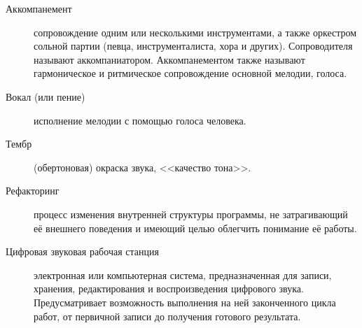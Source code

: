\begin{description}
\item[Аккомпанемент] сопровождение одним или несколькими инструментами, а также оркестром сольной партии (певца, инструменталиста, хора и других). Сопроводителя называют аккомпаниатором. Аккомпанементом также называют гармоническое и ритмическое сопровождение основной мелодии, голоса.
\item[Вокал (или пение)] исполнение мелодии с помощью голоса человека.
\item[Тембр] (обертоновая) окраска звука, <<качество тона>>.
\item[Рефакторинг] процесс изменения внутренней структуры программы, не затрагивающий её внешнего поведения и имеющий целью облегчить понимание её работы.
\item[Цифровая звуковая рабочая станция] электронная или компьютерная система, предназначенная для записи, хранения, редактирования и воспроизведения цифрового звука. Предусматривает возможность выполнения на ней законченного цикла работ, от первичной записи до получения готового результата.
\end{description}

